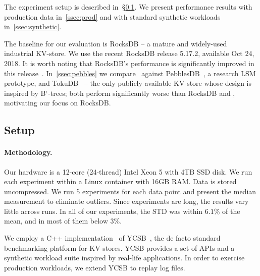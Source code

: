
The experiment setup is described in~\S\ref{ssec:setup}. 
We present performance results with production data in~\cref{ssec:prod} and with standard synthetic workloads in~\cref{ssec:synthetic}. 

The baseline for our evaluation is RocksDB -- a mature and widely-used industrial KV-store. 
We use the recent RocksDB release 5.17.2, available Oct 24, 2018.  It is worth noting that RocksDB's performance 
is significantly improved  in this release~\cite{CallaghanCompaction}.   
In~\cref{ssec:pebbles} we compare \sys\ against PebblesDB~\cite{PebblesDB}, a research LSM prototype, and TokuDB~\cite{TokuDB} -- the only publicly 
available KV-store whose design is inspired by B$^\epsilon$-trees;  both  perform significantly worse than RocksDB and \sys, motivating our 
focus on RocksDB.

 
\subsection{Setup}
\label{ssec:setup} 

\paragraph{Methodology.} 
Our hardware is a 12-core (24-thread) Intel Xeon 5  with 4TB SSD disk.  
We run each experiment within a Linux container with 16GB RAM. 
Data is stored uncompressed.
We run 5 experiments for each data point and present the median measurement to eliminate outliers. Since experiments are long, the results vary 
little across runs. In all of our experiments, the STD was within $6.1\%$ of the mean, and in most of them below $3\%$. 

We employ a C++ implementation~\cite{Cpp-YCSB} of YCSB~\cite{YCSB}, the  de facto standard  
benchmarking platform for KV-stores. YCSB provides a set of APIs and a synthetic workload suite inspired 
by real-life applications. In order to exercise production workloads, we extend YCSB to replay log files.
 

